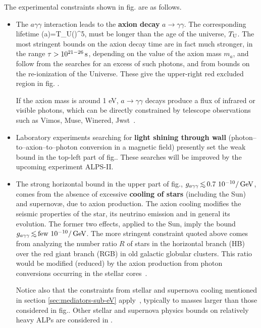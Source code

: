 \noindent The experimental constraints shown in fig. are as follows.
\begin{itemize}
\item[$-$] The $a\gamma\gamma$ interaction leads to the {\bf axion decay} $a\to\gamma\gamma$. The corresponding lifetime 
\beq 
\label{eq:axion:lieftime}
\tau(a\to\gamma\gamma)=\approx T_{\rm U}\left(\right)^5,
 \eeq
must be
longer than the age of the universe, $T_{\rm U}$. The most stringent bounds  on the axion decay time are in fact much stronger, in the range
$\tau > 10^{21-26}\,{\rm s}$, depending on the value of the axion mass $m_a$, and follow  
 from the searches for an excess  of such photons, and from bounds on the re-ionization of the Universe. These give the upper-right red excluded region in fig. \cite{axion:decay}.

If the axion mass is around 1 eV,  $a\to\gamma\gamma$ decays produce a flux of infrared or visible photons, which can be directly constrained by telescope observations such as {\sc Vimos}, {\sc Muse}, {\sc Winered}, {\sc Jwst}~\cite{axion:decay}.

\item[$-$] Laboratory experiments searching for {\bf light shining through wall} (photon--to--axion--to--photon conversion in a magnetic field)  \cite{ALPS,OSQAR,CROWS}
presently set the weak bound in the top-left part of fig..
These searches will be improved by the upcoming experiment ALPS-II.

\item[$-$] The strong horizontal bound in the upper part of fig., $g_{a\gamma\gamma}\circa{<}0.7~10^{-10}/\GeV$, comes from the absence of excessive {\bf cooling of stars} (including the Sun) and supernov\ae, due to axion production.
The axion cooling modifies the seismic properties of the star, its neutrino emission and in general its evolution. 
The former two effects, applied to the Sun, imply the bound $g_{a\gamma\gamma}\circa{<}{\rm few}~10^{-10}/\GeV$. 
The more stringent constraint quoted above comes from analyzing the number ratio $R$ of stars in the horizontal branch (HB) over the red giant branch (RGB) in old galactic globular clusters. 
This ratio would be modified (reduced) by the axion production from photon conversions occurring in the stellar cores~\cite{axioncooling}.

Notice also that the constraints from stellar and supernova cooling mentioned in section \ref{sec:mediators-sub-eV} apply~\cite{stellar:cooling,SN:constraints}, typically to masses larger than those considered in fig.. 
Other stellar and supernova physics bounds on relatively heavy ALPs are considered in \cite{otherSNboundsonALPs}.


\end{itemize}
